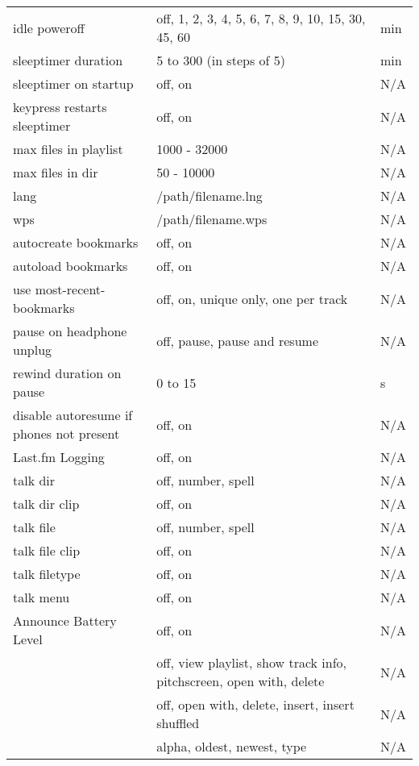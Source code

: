 \begin{center}
\begin{longtable}{>{\raggedright}p{}>{\raggedright}p{}p{}}
    idle poweroff   & off, 1, 2, 3, 4, 5, 6, 7, 8, 9, 10, 15, 30, 45, 60
                                        & min\\
    sleeptimer duration   & 5 to 300 (in steps of 5)
                                        & min\\
    sleeptimer on startup & off, on     & N/A\\
    keypress restarts sleeptimer & off, on & N/A\\
    max files in playlist & 1000 - 32000 & N/A\\
    max files in dir & 50 - 10000       & N/A\\
    lang            & /path/filename.lng & N/A\\
    wps             & /path/filename.wps & N/A\\
    autocreate bookmarks
                    & off, on           & N/A\\
    autoload bookmarks
                    & off, on           & N/A\\
    use most-recent-bookmarks
                    & off, on, unique only, one per track & N/A\\
    pause on headphone unplug & off, pause, pause and resume & N/A\\
    rewind duration on pause & 0 to 15  & s\\
    disable autoresume if phones not present & off, on & N/A\\
    Last.fm Logging & off, on           & N/A\\
    talk dir        & off, number, spell& N/A\\
    talk dir clip   & off, on           & N/A\\
    talk file       & off, number, spell& N/A\\
    talk file clip  & off, on           & N/A\\
    talk filetype   & off, on           & N/A\\
    talk menu       & off, on           & N/A\\
    Announce Battery Level & off, on    & N/A\\
    \opt{hotkey}{
    hotkey wps      & off, view playlist, show track info,
        pitchscreen, open with, delete  & N/A\\
    \nopt{touchscreen}{hotkey tree     & off, open with, delete, insert,
        insert shuffled                 & N/A\\}
    }
    sort files      & alpha, oldest, newest, type & N/A\\

\end{longtable}
\end{center}
